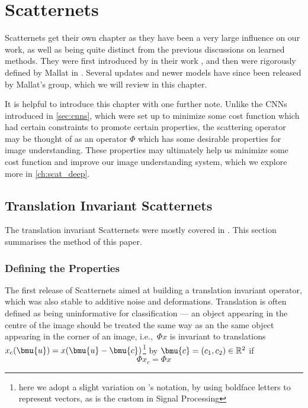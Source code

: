 \chapter{Scatternets}\label{ch:scatternets}

  Scatternets get their own chapter as they have been a very large influence on
  our work, as well as being quite distinct from the previous discussions on
  learned methods. They were first introduced by  
  \citeauthor{bruna_classification_2011} in their work 
  \citep{bruna_classification_2011}, and then were rigorously defined by Mallat
  in \citep{mallat_group_2012}. Several updates and newer models have since
  been released by Mallat's group, which we will review in this chapter.
  
  It is helpful to introduce this chapter with one further note. Unlike the
  CNNs introduced in \autoref{sec:cnns}, which were set up to minimize some
  cost function which had certain constraints to promote certain properties,
  the scattering operator may be thought of as an operator $\Phi$ which has
  some desirable properties for image understanding. These properties may
  ultimately help us minimize some cost function and improve our image
  understanding system, which we explore more in
  \autoref{ch:scat_deep}.


  \section{Translation Invariant Scatternets}
  The translation invariant Scatternets were mostly covered in
  \citep{bruna_invariant_2013}. This section summarises the method of this
  paper.

  \subsection{Defining the Properties}
  The first release of Scatternets aimed at building a translation invariant
  operator, which was also stable to additive noise and deformations. Translation
  is often defined as being uninformative for classification --- an object
  appearing in the centre of the image should be treated the same way as an
  the same object appearing in the corner of an image, i.e.,\ $\Phi x$ is
  invariant to translations $x_c(\bmu{u}) = x(\bmu{u}-\bmu{c})$\footnote{here
  we adopt a slight variation on \Bruna's notation, by using boldface letters to
  represent vectors, as is the custom in Signal Processing} by 
  $\bmu{c}=(c_1,c_2) \in \mathbb{R}^2$ if
  \begin{equation}\label{eq:scat_trans_invariance}
    \Phi x_c = \Phi x
  \end{equation}

